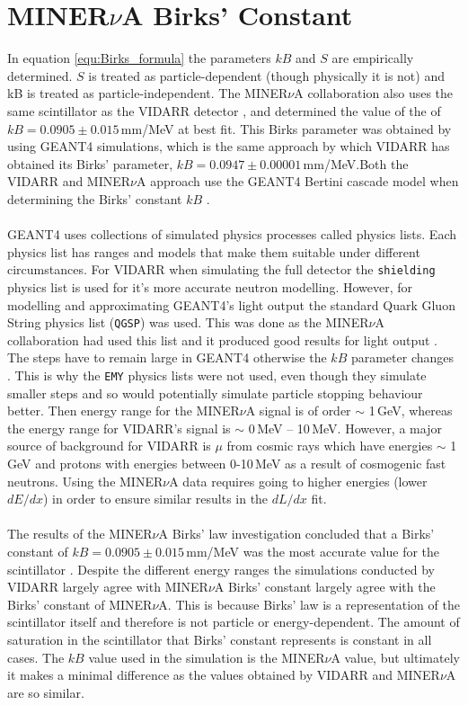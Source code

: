 \section{MINER$\nu$A Birks' Constant}\label{sec:GEANT4Simulation_MINERvABirksConstant}
In equation \ref{equ:Birks_formula} the parameters $kB$ and $S$ are empirically determined. $S$ is treated as particle-dependent (though physically it is not) and kB is treated as particle-independent. The MINER$\nu$A collaboration \cite{aliaga_2015} also uses the same scintillator as the VIDARR detector \cite{aliaga_2014}, and determined the value of the of $kB = 0.0905 \pm 0.015$\,mm/MeV at best fit. This Birks parameter was obtained by using GEANT4 simulations, which is the same approach by which VIDARR has obtained its Birks' parameter, $kB = 0.0947 \pm 0.00001$\,mm/MeV.Both the VIDARR and MINER$\nu$A approach use the GEANT4 Bertini cascade model when determining the Birks' constant $kB$ \cite{Heikkinen_2003}. 
\\\\GEANT4 uses collections of simulated physics processes called physics lists. Each physics list has ranges and models that make them suitable under different circumstances. For VIDARR when simulating the full detector the \texttt{shielding} physics list is used for it's more accurate neutron modelling. However, for modelling and approximating GEANT4's light output the standard Quark Gluon String physics list (\texttt{QGSP}) was used. This was done as the MINER$\nu$A collaboration had used this list and it produced good results for light output \cite{Patrick_2018}. The steps have to remain large in GEANT4 otherwise the $kB$ parameter changes \cite{aliaga_2015}. This is why the \texttt{EMY} physics lists were not used, even though they simulate smaller steps and so would potentially simulate particle stopping behaviour better. Then energy range for the MINER$\nu$A signal is of order $\sim$ 1\,GeV, whereas the energy range for VIDARR's signal is $\sim$ 0\,MeV -- 10\,MeV. However, a major source of background for VIDARR is $\mu$ from cosmic rays which have energies $\sim$ 1\,GeV and protons with energies between 0-10\,MeV as a result of cosmogenic fast neutrons. Using the MINER$\nu$A data requires going to higher energies (lower $dE/dx$) in order to ensure similar results in the $dL/dx$ fit.  
\\\\The results of the MINER$\nu$A Birks' law investigation concluded that a Birks' constant of $kB = 0.0905 \pm 0.015$\,mm/MeV was the most accurate value for the scintillator \cite{aliaga_2015}. Despite the different energy ranges the simulations conducted by VIDARR largely agree with MINER$\nu$A Birks' constant largely agree with the Birks' constant of MINER$\nu$A. This is because Birks' law is a representation of the scintillator itself and therefore is not particle or energy-dependent. The amount of saturation in the scintillator that Birks' constant represents is constant in all cases. The $kB$ value used in the simulation is the MINER$\nu$A value, but ultimately it makes a minimal difference as the values obtained by VIDARR and MINER$\nu$A are so similar. 
